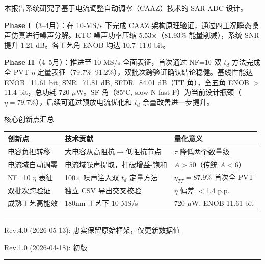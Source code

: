 \documentclass[11pt,a4paper,UTF8]{ctexart}
\begin{document}
本报告系统研究了基于电流调整自动调零（CAAZ）技术的 SAR ADC 设计。

\textbf{Phase I}（3--4月）：在 10-MS/s 下完成 CAAZ 架构原理验证，通过四工况瞬态噪声仿真进行噪声分解。KTC 噪声功率压缩 5.53$\times$（81.93\% 能量削减），系统 SNR 提升 1.21 dB。各工艺角 ENOB 均达 10.7--11.0 bit。

\textbf{Phase II}（4--5月）：推进至 10-MS/s 全面表征，首次通过 NF=10 双 $t_d$ 方法完成全 PVT $\eta$ 定量表征（79.7\%--91.2\%），双批次跨验证确认结论稳健。基线性能达 ENOB=11.61 bit, SNR=71.81 dB, SFDR=84.01 dB（TT 角），全五角 ENOB $>$11.4 bit，总功耗 720 $\mu$W。SF 角（85$^\circ$C, slow-N fast-P）为当前设计瓶颈（$\eta=79.7\%$），后续可通过预放电流优化和 $t_d$ 余量改善进一步提升。

\begin{findbox}{核心创新点汇总}
\begin{tabular}{lll}\toprule
\textbf{创新点} & \textbf{技术贡献} & \textbf{量化意义} \\\midrule
电容负担转移 & 大电容从高阻抗$\rightarrow$低阻抗节点 & $\tau$ 降低两个数量级 \\
电流域自动调零 & 电流域噪声提取，打破增益-饱和 & $A > 50$（传统 $A < 6$） \\
NF=10 $\eta$ 表征 & 100$\times$ 噪声注入双 $t_d$ 定量方法 & $\eta_{TT}=87.9\%$ 首次全 PVT \\
双批次跨验证 & 独立 CSV 导出交叉校验 & $\eta$ 偏差 $<$1.4 p.p. \\
成熟工艺高能效 & 180nm 工艺下 10-MS/s & 720 $\mu$W, ENOB 11.61 bit \\\bottomrule
\end{tabular}
\end{findbox}

\vspace{1cm}
\begin{center}\rule{0.5\textwidth}{0.4pt}
{\small Rev.4.0 (2026-05-13): 忠实保留原始框架，仅更新数据值}

{\small Rev.1.0 (2026-04-18): 初版}
\rule{0.5\textwidth}{0.4pt}
\end{center}
\end{document}
